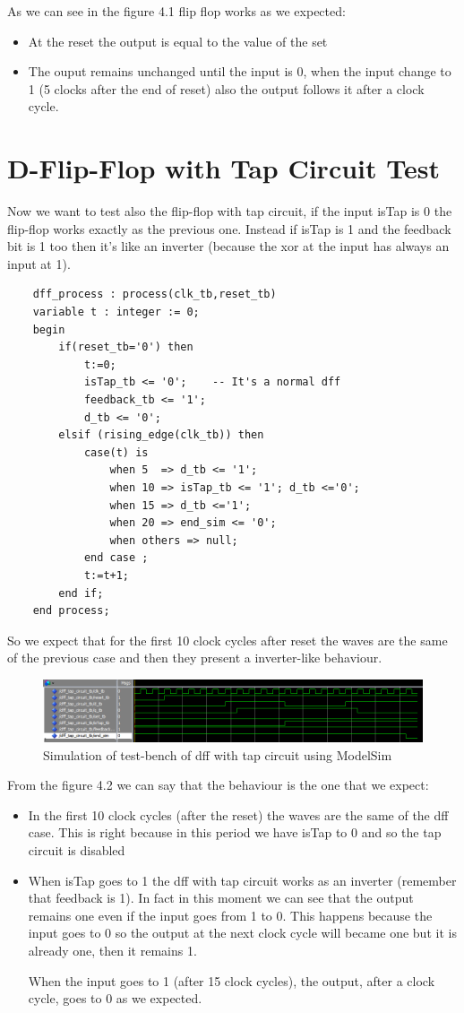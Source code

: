 \documentclass[a4paper]{report}
\begin{document}
\noindent As we can see in the figure 4.1 flip flop works as we expected:
\begin{itemize}
	\item At the reset the output is equal to the value of the set
	\item The ouput remains unchanged until the input is 0, when the input change to 1 (5 clocks after the end of reset) also the output follows it after a clock cycle.
\end{itemize}

\section{D-Flip-Flop with Tap Circuit Test}
Now we want to test also the flip-flop with tap circuit, if the input isTap is 0 the flip-flop works exactly as the previous one. Instead if isTap is 1 and the feedback bit is 1 too then it's like an inverter (because the xor at the input has always an input at 1).
\begin{lstlisting}
	dff_process : process(clk_tb,reset_tb)
	variable t : integer := 0;
	begin
		if(reset_tb='0') then
			t:=0;
			isTap_tb <= '0'; 	-- It's a normal dff
			feedback_tb <= '1';
			d_tb <= '0';
		elsif (rising_edge(clk_tb)) then
			case(t) is
				when 5  => d_tb <= '1';		
				when 10 => isTap_tb <= '1'; d_tb <='0';	
				when 15 => d_tb <='1';	
				when 20 => end_sim <= '0';
				when others => null;	
			end case ;
			t:=t+1;
		end if;
	end process;
\end{lstlisting}
So we expect that for the first 10 clock cycles after reset the waves are the same of the previous case and then they present a inverter-like behaviour.
\begin{figure}[htpb]
	\centering
	\includegraphics[width=.6\textheight, height=.125\textheight]{img/tb/wave_dff_tap_circuit_test.png}
	\caption{Simulation of test-bench of dff with tap circuit using ModelSim}
\end{figure}

\noindent From the figure 4.2 we can say that the behaviour is the one that we expect:
\begin{itemize}
	\item In the first 10 clock cycles (after the reset) the waves are the same of the dff case. This is right because in this period we have isTap to 0 and so the tap circuit is disabled
	\item When isTap goes to 1 the dff with tap circuit works as an inverter (remember that feedback is 1). In fact in this moment we can see that the output remains one even if the input goes from 1 to 0. This happens because the input goes to 0 so the output at the next clock cycle will became one but it is already one, then it remains 1.
	
	\noindent When the input goes to 1 (after 15 clock cycles), the output, after a clock cycle, goes to 0 as we expected. 
\end{itemize}
\end{document}
